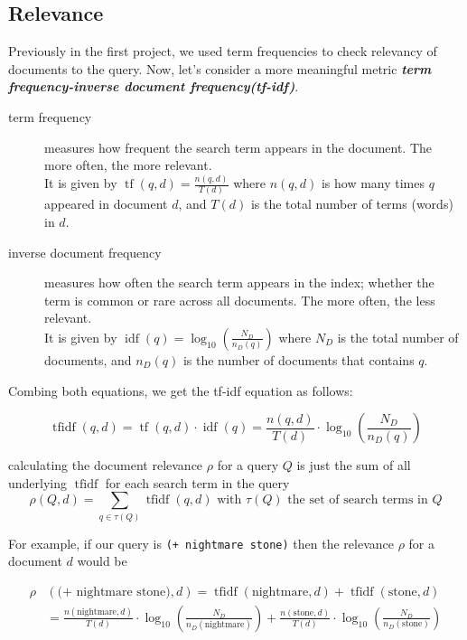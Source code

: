 \documentclass[11pt]{article}
\DeclareMathOperator{\tf}{tf}
\DeclareMathOperator{\idf}{idf}
\DeclareMathOperator{\tfidf}{tfidf}
\begin{document}
\subsection{Relevance}
\label{ssec:relevance}
Previously in the first project, we used term frequencies to check relevancy of documents to the query. Now, let's consider a more meaningful metric \textit{\textbf{term frequency-inverse document frequency(tf-idf)}}. 

\begin{description}
\item[term frequency] measures how frequent the search term appears in the document. The more often, the more relevant.\\
It is given by $\tf(q, d)= \frac{n(q,d)}{T(d)}$ where $n(q,d)$ is how many times $q$ appeared in document $d$, and $T(d)$ is the total number of terms (words) in $d$.
\item[inverse document frequency] measures how often the search term appears in the index; whether the term is common or rare across all documents. The more often, the less relevant.\\
It is given by $\idf(q) = \log_{10}(\frac{N_D}{n_D(q)})$ where $N_D$ is the total number of documents, and $n_D(q)$ is the number of documents that contains $q$.
\end{description} 

Combing both equations, we get the tf-idf equation as follows:

\begin{equation}
\tfidf(q, d) = \tf(q, d) \cdot \idf(q) = \frac{n(q,d)}{T(d)} \cdot  \log_{10}(\frac{N_D}{n_D(q)})
\end{equation}

calculating the document relevance $\rho$ for a query $Q$ is just the sum of all underlying $\tfidf$ for each search term in the query
\begin{equation}
\rho(Q, d) = \sum_{q \in \tau(Q) }  \tfidf(q, d) \mbox{ with } \tau(Q) \mbox{ the set of search terms in } Q
\end{equation}

For example, if our query is \texttt{(+ nightmare stone)} then the relevance $\rho$ for a document $d$ would be

\begin{align*}
\rho&(\mbox{(+ nightmare stone)}, d) = \tfidf(\mbox{nightmare}, d) + \tfidf(\mbox{stone}, d) \\
&= \frac{n(\mbox{nightmare},d)}{T(d)} \cdot  \log_{10}(\frac{N_D}{n_D(\mbox{nightmare})}) + \frac{n(\mbox{stone},d)}{T(d)} \cdot  \log_{10}(\frac{N_D}{n_D(\mbox{stone})})
\end{align*}
\end{document}
